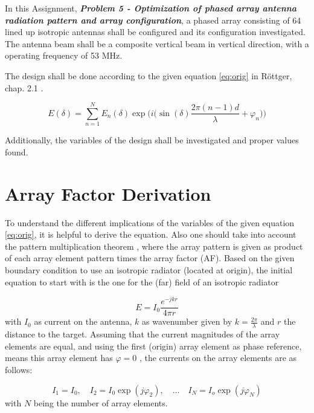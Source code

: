 

In this Assignment, \textit{\textbf{Problem 5 - Optimization of phased array antenna radiation pattern and array configuration}}, a phased array consisting of 64 lined up isotropic antennas shall be configured and its configuration investigated. The antenna beam shall be a composite vertical beam in vertical direction, with a operating frequency of 53 MHz.

The design shall be done according to the given equation \ref{eq:orig} in Röttger, chap. 2.1 \citep{roettger1989instrumental}.

\begin{equation}
	E(\delta) = \sum_{n=1}^N E_n(\delta) \exp \Bigg(i\Big(\sin(\delta)\frac{2 \pi (n-1)d}{\lambda}  + \varphi_n \Big)\Bigg)
	\label{eq:orig}
\end{equation}

Additionally, the variables of the design shall be investigated and proper values found.

\section{Array Factor Derivation}
\label{chap:derivation}
To understand the different implications of the variables of the given equation \ref{eq:orig}, it is helpful to derive the equation. Also one should take into account the pattern multiplication theorem \citep{donohoe:lecture}, where the array pattern is given as product of each array element pattern times the array factor (AF).
Based on the given boundary condition to use an isotropic radiator (located at origin), the initial equation to start with is the one for the (far) field of an isotropic radiator

\begin{equation}
	E = I_0 \frac{e^{-jkr}}{4\pi r}
	\label{eq:iso_radiator}
\end{equation}
with $I_0$ as current on the antenna, $k$ as wavenumber given by $k = \frac{2\pi}{\lambda}$ and $r$ the distance to the target.
Assuming that the current magnitudes of the array elements are equal, and using the first (origin) array element as phase reference, means this array element has $\varphi = 0$ \citep{donohoe:lecture}, the currents on the array elements are as follows:

\begin{equation}
	I_1 = I_0 , \quad I_2 = I_0 \exp(j \varphi_{2}), \quad \dots \quad I_N = I_o \exp(j \varphi_{N})
	\label{eq:currents}
\end{equation}
with $N$ being the number of array elements.

